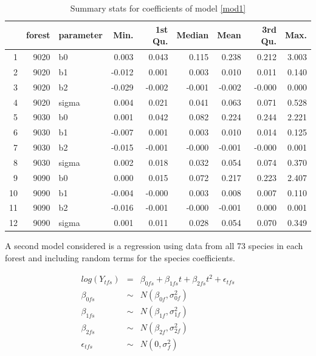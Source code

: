 \documentclass{article}\usepackage{graphicx, color}
\begin{document}
\begin{table}[hbpt] 
\caption{Summary stats for coefficients of model \ref{mod1} \label{tab1}}
\begin{center}
\begin{tabular}{rrlrrrrrr} 
  \hline
 & forest & parameter & Min. & 1st Qu. & Median & Mean & 3rd Qu. & Max. \\ 
  \hline
1 & 9020 & b0 & 0.003 & 0.043 & 0.115 & 0.238 & 0.212 & 3.003 \\ 
  2 & 9020 & b1 & -0.012 & 0.001 & 0.003 & 0.010 & 0.011 & 0.140 \\ 
  3 & 9020 & b2 & -0.029 & -0.002 & -0.001 & -0.002 & -0.000 & 0.000 \\ 
  4 & 9020 & sigma & 0.004 & 0.021 & 0.041 & 0.063 & 0.071 & 0.528 \\ \hline
  5 & 9030 & b0 & 0.001 & 0.042 & 0.082 & 0.224 & 0.244 & 2.221 \\ 
  6 & 9030 & b1 & -0.007 & 0.001 & 0.003 & 0.010 & 0.014 & 0.125 \\ 
  7 & 9030 & b2 & -0.015 & -0.001 & -0.000 & -0.001 & -0.000 & 0.001 \\ 
  8 & 9030 & sigma & 0.002 & 0.018 & 0.032 & 0.054 & 0.074 & 0.370 \\ \hline
  9 & 9090 & b0 & 0.000 & 0.015 & 0.072 & 0.217 & 0.223 & 2.407 \\ 
  10 & 9090 & b1 & -0.004 & -0.000 & 0.003 & 0.008 & 0.007 & 0.110 \\ 
  11 & 9090 & b2 & -0.016 & -0.001 & -0.000 & -0.001 & 0.000 & 0.001 \\ 
  12 & 9090 & sigma & 0.001 & 0.011 & 0.028 & 0.054 & 0.070 & 0.349 \\ 
   \hline
\end{tabular}
\end{center}
\end{table}

A second model considered is a regression using data from all 73 species in each forest and including random terms for the species coefficients. 

\begin{eqnarray}
\nonumber log(Y_{tfs}) &=&  \beta_{0fs} + \beta_{1fs}t + \beta_{2fs}t^2 + \epsilon_{tfs}  \\
\nonumber \beta_{0fs} &\sim& N(\beta_{0f}, \sigma_{0f}^2 ) \\ 
\nonumber \beta_{1fs} &\sim& N(\beta_{1f}, \sigma_{1f}^2 ) \\ 
\nonumber \beta_{2fs} &\sim& N(\beta_{2f}, \sigma_{2f}^2 ) \\ 
\epsilon_{tfs} &\sim& N(0,\sigma_f^2)
\label{mod2}
\end{eqnarray}
\end{document}
